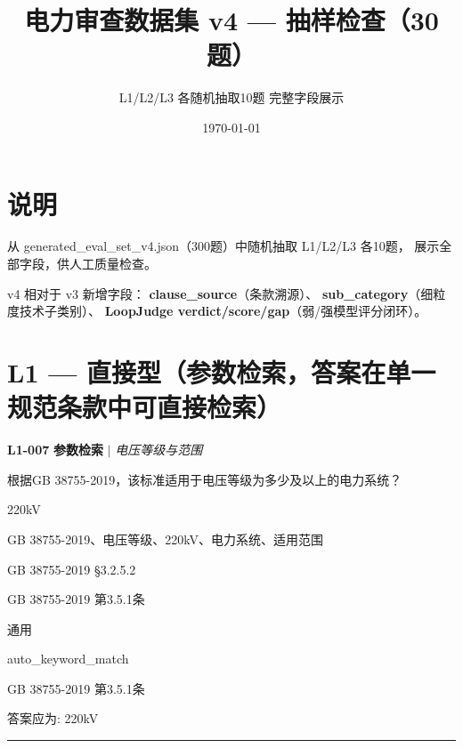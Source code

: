 \documentclass[11pt,a4paper]{ctexart}
\title{\textbf{电力审查数据集 v4 — 抽样检查（30题）}}
\author{L1/L2/L3 各随机抽取10题 \quad 完整字段展示}
\date{\today}
\begin{document}
\maketitle
\thispagestyle{fancy}

\section*{说明}
从 generated\_eval\_set\_v4.json（300题）中随机抽取 L1/L2/L3 各10题，
展示全部字段，供人工质量检查。

v4 相对于 v3 新增字段：
\textbf{clause\_source}（条款溯源）、
\textbf{sub\_category}（细粒度技术子类别）、
\textbf{LoopJudge verdict/score/gap}（弱/强模型评分闭环）。

\vspace{6pt}

\section*{L1 — 直接型（参数检索，答案在单一规范条款中可直接检索）}

\noindent\textbf{L1-007} \hfill \textbf{参数检索} $|$ \textit{电压等级与范围}
\begin{description}[leftmargin=1.5em,style=nextline,font=\normalfont]
  \item[Q:] 根据GB 38755-2019，该标准适用于电压等级为多少及以上的电力系统？
  \item[A:] 220kV
  \item[KW:] GB 38755-2019、电压等级、220kV、电力系统、适用范围
  \item[标准:] GB 38755-2019 §3.2.5.2
  \item[条款溯源:] GB 38755-2019 第3.5.1条
  \item[主题:] 通用
  \item[评分方式:] auto\_keyword\_match
  \item[Rubric条款:] GB 38755-2019 第3.5.1条
  \item[Rubric判据:] 答案应为: 220kV

\end{description}
\vspace{4pt}
\hrule
\vspace{6pt}
\end{document}
